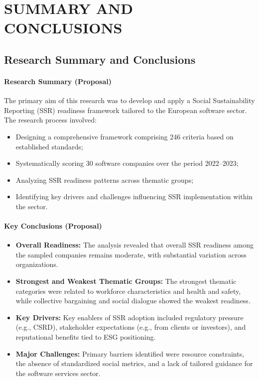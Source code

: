 \chapter{SUMMARY AND CONCLUSIONS}

\section{Research Summary and Conclusions}

\subsubsection{Research Summary (Proposal)}

The primary aim of this research was to develop and apply a Social Sustainability Reporting (SSR) 
readiness framework tailored to the European software sector. The research process involved:

\begin{itemize}
    \item Designing a comprehensive framework comprising 246 criteria based on established standards;
    \item Systematically scoring 30 software companies over the period 2022–2023;
    \item Analyzing SSR readiness patterns across thematic groups;
    \item Identifying key drivers and challenges influencing SSR implementation within the sector.
\end{itemize}

\subsubsection{Key Conclusions (Proposal)}

\begin{itemize}
    \item \textbf{Overall Readiness:} The analysis revealed that overall SSR readiness 
    among the sampled companies remains moderate, with substantial variation across organizations.

    \item \textbf{Strongest and Weakest Thematic Groups:} The strongest thematic categories were related to 
    workforce characteristics and health and safety, while collective bargaining 
    and social dialogue showed the weakest readiness.
    \item \textbf{Key Drivers:} Key enablers of SSR adoption included regulatory pressure (e.g., CSRD), 
    stakeholder expectations (e.g., from clients or investors), and reputational benefits tied to ESG positioning.
    
    \item \textbf{Major Challenges:} Primary barriers identified were resource constraints, 
    the absence of standardized social metrics, and a lack of tailored guidance for the software services sector.
\end{itemize}

